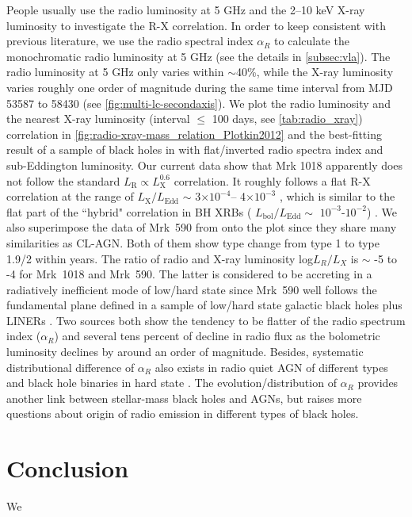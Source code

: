 \documentclass[twocolumn]{aastex63}
\begin{document}
People usually use the radio luminosity at 5 GHz and the 2--10 keV X-ray luminosity to investigate the R-X correlation. In order to keep consistent with previous literature, we use the radio spectral index $\alpha_R$ to calculate the monochromatic radio luminosity at 5 GHz (see the details in \autoref{subsec:vla}). The radio luminosity at 5 GHz only varies within $\sim$40\%, while the X-ray luminosity varies roughly one order of magnitude during the same time interval from MJD 53587 to 58430 (see \autoref{fig:multi-lc-secondaxis}). We plot the radio luminosity and the nearest X-ray luminosity (interval $\le$ 100 days, see \autoref{tab:radio_xray}) correlation in \autoref{fig:radio-xray-mass_relation_Plotkin2012} and the best-fitting result of a sample of black holes in \citet{2012MNRAS.419..267P} with flat/inverted radio spectra index and sub-Eddington luminosity. Our current data show that Mrk 1018 apparently does not follow the standard $L_\mathrm{R}\propto L_\mathrm{X}^{0.6}$ correlation. It roughly follows a flat R-X correlation at the range of $L_\mathrm{X}/L_\mathrm{Edd}$ $\sim$ 3$\times 10^{-4}$-- 4$\times 10^{-3}$ , which is similar to the flat part of the ``hybrid" correlation in BH XRBs ( $L_\mathrm{bol}/L_\mathrm{Edd} \sim$ $10^{-3}$-$10^{-2}$) \citep[see e.g.][]{2018MNRAS.473.4122E,2020ApJ...891...31X}. We also superimpose the data of Mrk~590 from \citet[][]{2016MNRAS.460..304K} onto the plot since they share many similarities as CL-AGN. Both of them show type change from type 1 to type 1.9/2 within years. The ratio of radio and X-ray luminosity log$L_R/L_X$ is $\sim$ -5 to -4 for Mrk~1018 and Mrk~590. The latter is considered to be accreting in a radiatively inefficient mode of low/hard state since Mrk~590 well follows the fundamental plane defined in a sample of low/hard state galactic black holes plus LINERs \citep[see discussion in ][]{2016MNRAS.460..304K}. Two sources both show the tendency to be flatter of the radio spectrum index ($\alpha_R$) and several tens percent of decline in radio flux as the bolometric luminosity declines by around an order of magnitude. Besides, systematic distributional difference of $\alpha_R$ also exists in radio quiet AGN of different types \citep[e.g.][]{2019MNRAS.485.3185C} and black hole binaries in hard state \citep[see][]{2018MNRAS.473.4122E}. The evolution/distribution of $\alpha_R$ provides another link between stellar-mass black holes and AGNs, but raises more questions about origin of radio emission in different types of black holes. 

\section{Conclusion}\label{sec:conclusion}
We 
\end{document}
